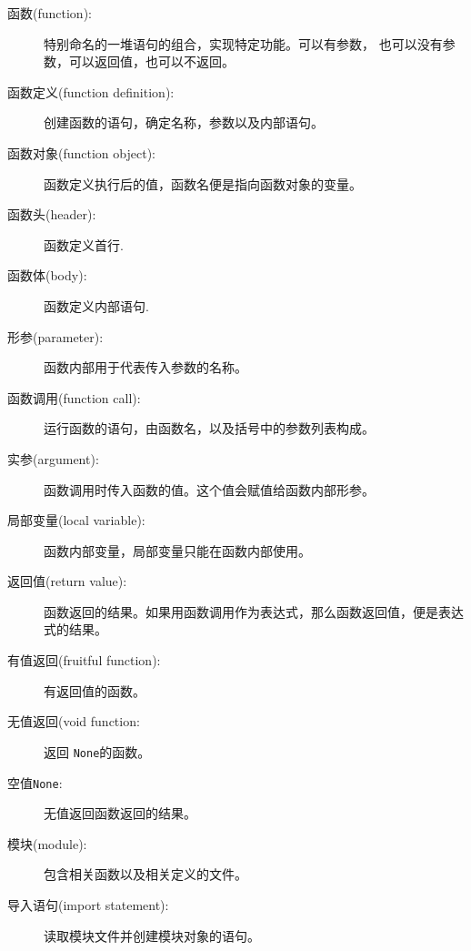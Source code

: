 \documentclass[10pt]{book}
\begin{document}
\begin{description}

\item[函数(function):] 特别命名的一堆语句的组合，实现特定功能。可以有参数，
也可以没有参数，可以返回值，也可以不返回。

\item[函数定义(function definition):]  创建函数的语句，确定名称，参数以及内部语句。

\item[函数对象(function object):]  函数定义执行后的值，函数名便是指向函数对象的变量。

\item[函数头(header):] 函数定义首行.

\item[函数体(body):] 函数定义内部语句.

\item[形参(parameter):] 函数内部用于代表传入参数的名称。

\item[函数调用(function call):] 运行函数的语句，由函数名，以及括号中的参数列表构成。

\item[实参(argument):]  函数调用时传入函数的值。这个值会赋值给函数内部形参。

\item[局部变量(local variable):]  函数内部变量，局部变量只能在函数内部使用。

\item[返回值(return value):]  函数返回的结果。如果用函数调用作为表达式，那么函数返回值，便是表达式的结果。

\item[有值返回(fruitful function):] 有返回值的函数。

\item[无值返回(void function:] 返回 {\tt None}的函数。

\item[空值{\tt None}:] 无值返回函数返回的结果。

\item[模块(module):] 包含相关函数以及相关定义的文件。

\item[导入语句(import statement):] 读取模块文件并创建模块对象的语句。


\end{description}
\end{document}
